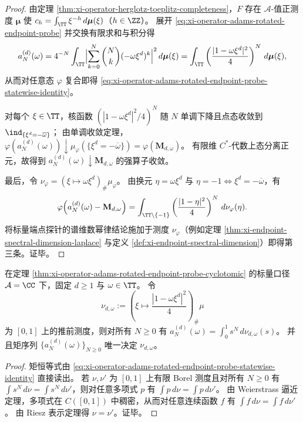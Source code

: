\begin{proof}
由定理 \ref{thm:xi-operator-herglotz-toeplitz-completeness}，\(F\) 存在 \(\mathcal A\)-值正测度 \(\boldsymbol\mu\) 使
\(
c_h=\int_{\TT}\xi^{-h}\,d\boldsymbol\mu(\xi)
\)（\(h\in\ZZ\)）。
展开 \eqref{eq:xi-operator-adams-rotated-endpoint-probe} 并交换有限求和与积分得
\[
a^{(d)}_N(\omega)
=4^{-N}\int_{\TT}\Bigl|\sum_{k=0}^{N}\binom Nk(-\omega\xi^d)^k\Bigr|^2\,d\boldsymbol\mu(\xi)
=\int_{\TT}\left(\frac{|1-\omega\xi^{d}|^2}{4}\right)^{N}\,d\boldsymbol\mu(\xi),
\]
从而对任意态 \(\varphi\) 复合即得 \eqref{eq:xi-operator-adams-rotated-endpoint-probe-statewise-identity}。
\par
对每个 \(\xi\in\TT\)，核函数 \(\left(|1-\omega\xi^d|^2/4\right)^N\) 随 \(N\) 单调下降且点态收敛到 \(\ind_{\{\xi^d=-\overline\omega\}}\)；
由单调收敛定理，
\(
\varphi(a^{(d)}_N(\omega))\downarrow \mu_\varphi(\{\xi^d=-\overline\omega\})
=\varphi(\mathbf{M}_{d,\omega})
\)。
有限维 \(C^\ast\)-代数上态分离正元，故得到 \(a^{(d)}_N(\omega)\downarrow \mathbf{M}_{d,\omega}\) 的强算子收敛。
\par
最后，令 \(\nu_\varphi=(\xi\mapsto \omega\xi^d)_\#\mu_\varphi\)。
由换元 \(\eta=\omega\xi^d\) 与 \(\eta=-1\iff \xi^d=-\overline\omega\)，有
\[
\varphi\!\left(a^{(d)}_N(\omega)-\mathbf{M}_{d,\omega}\right)
=\int_{\TT\setminus\{-1\}}\left(\frac{|1-\eta|^2}{4}\right)^N\,d\nu_\varphi(\eta).
\]
将标量端点探针的谱维数幂律结论施加于测度 \(\nu_\varphi\)（例如定理 \ref{thm:xi-endpoint-spectral-dimension-laplace} 与定义 \ref{def:xi-endpoint-spectral-dimension}）即得第三条。证毕。
\end{proof}

\begin{corollary}\label{cor:xi-endpoint-probe-hausdorff-determinacy}
在定理 \ref{thm:xi-operator-adams-rotated-endpoint-probe-cyclotomic} 的标量口径 \(\mathcal A=\CC\) 下，固定 \(d\ge 1\) 与 \(\omega\in\TT\)。
令
\[
\nu_{d,\omega}:=\left(\xi\mapsto \frac{|1-\omega\xi^d|^{2}}{4}\right)_\#\mu
\]
为 \([0,1]\) 上的推前测度，则对所有 \(N\ge 0\) 有
\(
a^{(d)}_N(\omega)=\int_{0}^{1}s^{N}\,d\nu_{d,\omega}(s)
\)。
并且矩序列 \(\{a^{(d)}_N(\omega)\}_{N\ge 0}\) 唯一决定 \(\nu_{d,\omega}\)。
\end{corollary}

\begin{proof}
矩恒等式由 \eqref{eq:xi-operator-adams-rotated-endpoint-probe-statewise-identity} 直接读出。
若 \(\nu,\nu'\) 为 \([0,1]\) 上有限 Borel 测度且对所有 \(N\ge 0\) 有 \(\int s^N\,d\nu=\int s^N\,d\nu'\)，则对任意多项式 \(p\) 有 \(\int p\,d\nu=\int p\,d\nu'\)。
由 Weierstrass 逼近定理，多项式在 \(C([0,1])\) 中稠密，从而对任意连续函数 \(f\) 有 \(\int f\,d\nu=\int f\,d\nu'\)。
由 Riesz 表示定理得 \(\nu=\nu'\)。证毕。
\end{proof}

